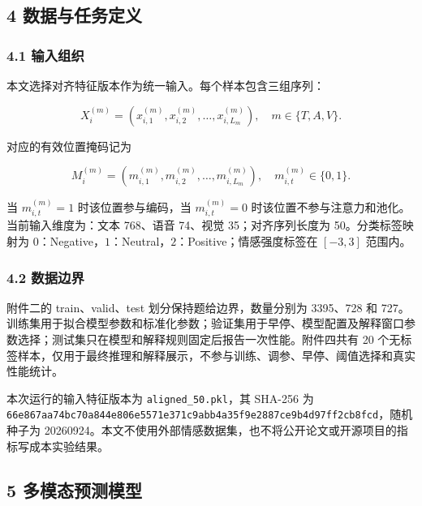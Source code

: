 \documentclass[
  12pt,
  a4paper,
]{ctexart}
\begin{document}
\hypertarget{ux6570ux636eux4e0eux4efbux52a1ux5b9aux4e49}{%
\subsection{4
数据与任务定义}\label{ux6570ux636eux4e0eux4efbux52a1ux5b9aux4e49}}

\hypertarget{ux8f93ux5165ux7ec4ux7ec7}{%
\subsubsection{4.1 输入组织}\label{ux8f93ux5165ux7ec4ux7ec7}}

本文选择对齐特征版本作为统一输入。每个样本包含三组序列：

\[
X_i^{(m)}=\left(x_{i,1}^{(m)},x_{i,2}^{(m)},\ldots,x_{i,L_m}^{(m)}\right),\quad m\in\{T,A,V\}.
\tag{1}
\]

对应的有效位置掩码记为

\[
M_i^{(m)}=\left(m_{i,1}^{(m)},m_{i,2}^{(m)},\ldots,m_{i,L_m}^{(m)}\right),\quad m_{i,t}^{(m)}\in\{0,1\}.
\tag{2}
\]

当 \(m_{i,t}^{(m)}=1\) 时该位置参与编码，当 \(m_{i,t}^{(m)}=0\)
时该位置不参与注意力和池化。当前输入维度为：文本 768、语音 74、视觉
35；对齐序列长度为 50。分类标签映射为
\(0\)：Negative，\(1\)：Neutral，\(2\)：Positive；情感强度标签在
\([-3,3]\) 范围内。

\hypertarget{ux6570ux636eux8fb9ux754c}{%
\subsubsection{4.2 数据边界}\label{ux6570ux636eux8fb9ux754c}}

附件二的 train、valid、test 划分保持题给边界，数量分别为 3395、728 和
727。训练集用于拟合模型参数和标准化参数；验证集用于早停、模型配置及解释窗口参数选择；测试集只在模型和解释规则固定后报告一次性能。附件四共有
20
个无标签样本，仅用于最终推理和解释展示，不参与训练、调参、早停、阈值选择和真实性能统计。

本次运行的输入特征版本为 \texttt{aligned\_50.pkl}，其 SHA-256 为
\texttt{66e867aa\allowbreak 74bc70a8\allowbreak 44e806e5\allowbreak 571e371c\allowbreak 9abb4a35\allowbreak f9e2887c\allowbreak e9b4d97f\allowbreak f2cb8fcd}，随机种子为
20260924。本文不使用外部情感数据集，也不将公开论文或开源项目的指标写成本实验结果。

\hypertarget{ux591aux6a21ux6001ux9884ux6d4bux6a21ux578b}{%
\subsection{5
多模态预测模型}\label{ux591aux6a21ux6001ux9884ux6d4bux6a21ux578b}}
\end{document}
